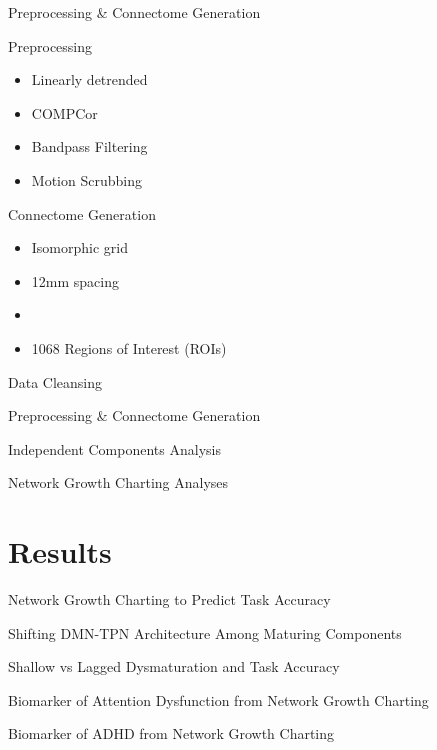 \documentclass[presentation]{beamer}
\begin{document}
\begin{frame}[label={sec:orgheadline13}]{Preprocessing \& Connectome Generation}
\begin{block}{Preprocessing}
\begin{itemize}
\item Linearly detrended
\item COMPCor
\item Bandpass Filtering
\item Motion Scrubbing
\end{itemize}
\end{block}
\begin{block}{Connectome Generation}
\begin{itemize}
\item Isomorphic grid
\item 12mm spacing
\item 

\item 1068 Regions of Interest (ROIs)
\end{itemize}
\end{block}
\end{frame}
\begin{frame}[label={sec:orgheadline14}]{Data Cleansing}
\end{frame}
\begin{frame}[label={sec:orgheadline15}]{Preprocessing \& Connectome Generation}
\end{frame}
\begin{frame}[label={sec:orgheadline16}]{Independent Components Analysis}
\end{frame}
\begin{frame}[label={sec:orgheadline17}]{Network Growth Charting Analyses}
\end{frame}
\section{Results}
\label{sec:orgheadline24}
\begin{frame}[label={sec:orgheadline19}]{Network Growth Charting to Predict Task Accuracy}
\end{frame}
\begin{frame}[label={sec:orgheadline20}]{Shifting DMN-TPN Architecture Among Maturing Components}
\end{frame}
\begin{frame}[label={sec:orgheadline21}]{Shallow vs Lagged Dysmaturation and Task Accuracy}
\end{frame}
\begin{frame}[label={sec:orgheadline22}]{Biomarker of Attention Dysfunction from Network Growth Charting}
\end{frame}
\begin{frame}[label={sec:orgheadline23}]{Biomarker of ADHD from Network Growth Charting}
\end{frame}
\end{document}

